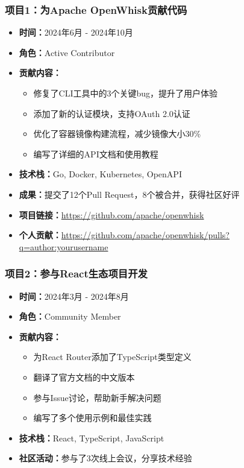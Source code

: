 \documentclass[a4paper,12pt]{article}
\begin{document}
\subsubsection{项目1：为Apache OpenWhisk贡献代码}
\begin{itemize}
    \item \textbf{时间：}2024年6月 - 2024年10月
    \item \textbf{角色：}Active Contributor
    \item \textbf{贡献内容：}
    \begin{itemize}
        \item 修复了CLI工具中的3个关键bug，提升了用户体验
        \item 添加了新的认证模块，支持OAuth 2.0认证
        \item 优化了容器镜像构建流程，减少镜像大小30\%
        \item 编写了详细的API文档和使用教程
    \end{itemize}
    \item \textbf{技术栈：}Go, Docker, Kubernetes, OpenAPI
    \item \textbf{成果：}提交了12个Pull Request，8个被合并，获得社区好评
    \item \textbf{项目链接：}\url{https://github.com/apache/openwhisk}
    \item \textbf{个人贡献：}\url{https://github.com/apache/openwhisk/pulls?q=author:yourusername}
\end{itemize}

\subsubsection{项目2：参与React生态项目开发}
\begin{itemize}
    \item \textbf{时间：}2024年3月 - 2024年8月
    \item \textbf{角色：}Community Member
    \item \textbf{贡献内容：}
    \begin{itemize}
        \item 为React Router添加了TypeScript类型定义
        \item 翻译了官方文档的中文版本
        \item 参与Issue讨论，帮助新手解决问题
        \item 编写了多个使用示例和最佳实践
    \end{itemize}
    \item \textbf{技术栈：}React, TypeScript, JavaScript
    \item \textbf{社区活动：}参与了3次线上会议，分享技术经验
\end{itemize}
\end{document}
